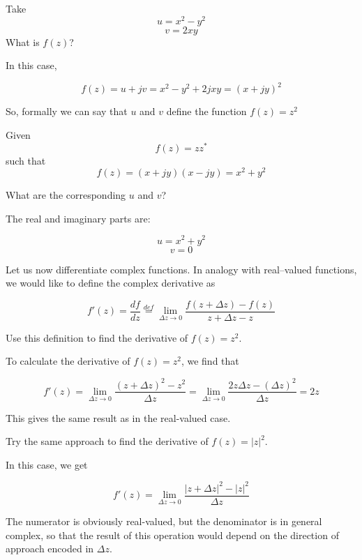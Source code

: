 \begin{cue}
Take
$$u = x^2 - y^2$$
$$v = 2 x y$$
What is $f(z)$?
\end{cue}

In this case,

$$f(z) = u + j v = x^2 - y^2 +2j x y = (x + jy)^2$$

So, formally we can say that $u$ and $v$ define the function $f(z) = z^2$

\begin{cue}
Given
$$f(z) = z z^* $$
such that
$$f(z) = (x + jy)(x - jy) = x^2 + y^2$$

What are the corresponding $u$ and $v$?
\end{cue}

The real and imaginary parts are:

$$u = x^2 + y^2$$
$$v = 0$$


Let us now differentiate complex functions. In analogy with real--valued functions, we would like to define the complex derivative as

\begin{equation}
f' (z)=\frac{df}{dz} \stackrel{def}{=} \lim_{\Delta z \to 0} \frac{f(z+\Delta z) - f(z)}{z+\Delta z - z} \label{eq-deriv}
\end{equation} 

\begin{cue}
Use this definition to find the derivative of $f(z)=z^2$.
\end{cue}

To calculate the derivative of  $f(z)=z^2$, we find that

$$f'(z)=\lim_{\Delta z \to 0} \frac{(z+\Delta z)^2 - z^2}{\Delta z} = \lim_{\Delta z \to 0} \frac{2 z \Delta z - (\Delta z)^2}{\Delta z}=2z $$

This gives the same result as in the real-valued case.

\begin{cue}
Try the same approach to find the derivative of $f(z)=|z|^2$.
\end{cue}

In this case, we get

$$f'(z)=\lim_{\Delta z \to 0} \frac{|z+\Delta z|^2 - |z|^2}{\Delta z} $$

The numerator is obviously real-valued, but the denominator is in general complex, so that the result of this operation would depend on the direction of approach encoded in $\Delta z$.

